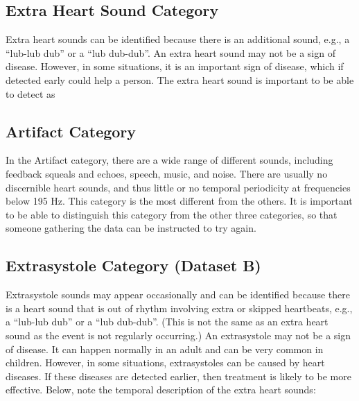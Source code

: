 \subsection{Extra Heart Sound Category}
Extra heart sounds can be identified because there is an additional sound, e.g., a ``lub-lub dub'' or a ``lub dub-dub''. An extra heart sound may not be a sign of disease.
However, in some situations, it is an important sign of disease, which if detected early could help a person. The extra heart sound is important to be able to detect as

\subsection{Artifact Category}
In the Artifact category, there are a wide range of different sounds, including feedback squeals and echoes, speech, music, and noise. There are usually no discernible heart sounds,
and thus little or no temporal periodicity at frequencies below 195 Hz. This category is the most different from the others. It is important to be able to distinguish this category
from the other three categories, so that someone gathering the data can be instructed to try again.

\subsection{Extrasystole Category (Dataset B)}
Extrasystole sounds may appear occasionally and can be identified because there is a heart sound that is out of rhythm involving extra or skipped heartbeats,
e.g., a ``lub-lub dub'' or a ``lub dub-dub''. (This is not the same as an extra heart sound as the event is not regularly occurring.) An extrasystole may not be a sign of disease.
It can happen normally in an adult and can be very common in children. However, in some situations, extrasystoles can be caused by heart diseases. If these diseases are detected earlier,
then treatment is likely to be more effective. Below, note the temporal description of the extra heart sounds:

